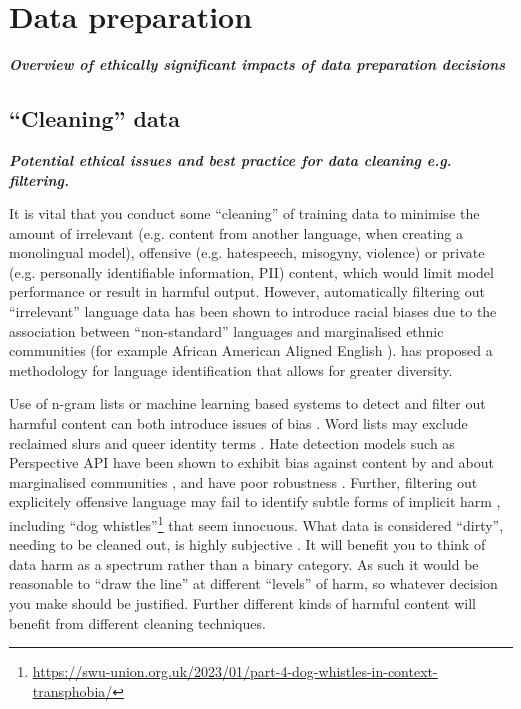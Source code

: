 \section{Data preparation}\label{sec:prep}

\noindent\textbf{\textit{Overview of ethically significant impacts of data preparation decisions}}
\newline 


\subsection{``Cleaning'' data}\label{subsec:clean}\noindent\textbf{\textit{Potential ethical issues and best practice for data cleaning e.g. filtering.}}
\newline 

\noindent It is vital that you conduct some ``cleaning'' of training data to minimise the amount of irrelevant (e.g. content from another language, when creating a monolingual model), offensive (e.g. hatespeech, misogyny, violence) or private (e.g. personally identifiable information, PII) content, which would limit model performance or result in harmful output. However, automatically filtering out ``irrelevant'' language data has been shown to introduce racial biases due to the association between ``non-standard'' languages and marginalised ethnic communities (for example African American Aligned English \citep{blodgett_racial_2017}). \citet{jurgens_incorporating_2017} has proposed a methodology for language identification that allows for greater diversity. 

Use of n-gram lists or machine learning based systems to detect and filter out harmful content can both introduce issues of bias \citep{anwar2024foundational}. Word lists may exclude reclaimed slurs and queer identity terms \cite{bender_dangers_2021}. Hate detection models such as Perspective API have been shown to exhibit bias against content by and about marginalised communities \citep{rottger_hatecheck_2021}, and have poor robustness \cite{calabrese_aaa_2021}. Further, filtering out explicitely offensive language may fail to identify subtle forms of implicit harm \cite{gadiraju_i_2023,talat_understanding_2017}, including ``dog whistles''\footnote{\url{https://swu-union.org.uk/2023/01/part-4-dog-whistles-in-context-transphobia/}} that seem innocuous. What data is considered ``dirty'', needing to be cleaned out, is highly subjective \citep{thylstrup_detecting_2020}. It will benefit you to think of data harm as a spectrum rather than a binary category. As such it would be reasonable to ``draw the line'' at different ``levels'' of harm, so whatever decision you make should be justified. Further different kinds of harmful content will benefit from different cleaning techniques. 


